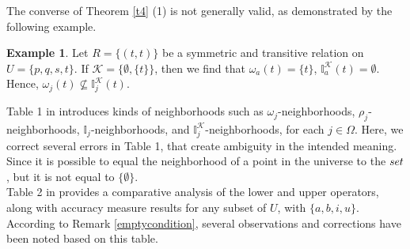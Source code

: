 \documentclass{article}
\theoremstyle{theorem}
\theoremstyle{definition}
\newtheorem{example}{Example}[section]
\theoremstyle{remark}
\begin{document}
The converse of Theorem \ref{t4} (1) is not generally valid, as demonstrated by the following example.

\begin{example}\label{e2} Let $R = \{(t, t)\}$ be a symmetric and transitive relation on $U=\{p, q, s, t\}$. If $\mathcal{K} = \{\emptyset, \{t\}\}$, then we find that $\omega_{a}(t)=\{t\}$, $\mathbb{I}^{\mathcal{K}}_{a}(t)=\emptyset$. Hence, $\omega_{j}(t) \nsubseteq \mathbb{I}^{\mathcal{K}}_{j}(t)$.
\end{example}

Table 1 in \cite{Al-shami 2024} introduces kinds of neighborhoods such as $\omega_{j}$-neighborhoods,  $\rho_{j}$-neighborhoods, $\mathbb{I}_{j}$-neighborhoods, and $\mathbb{I}^{\mathcal{K}}_{j}$-neighborhoods, for each $j \in \Omega$. Here, we correct several errors in Table 1, that create ambiguity in the intended meaning. Since it is possible to equal the neighborhood of a point in the universe to the $\empty set$, but it is not equal to  $\{\emptyset\}$.\\


Table 2 in \cite{Al-shami 2024} provides a comparative analysis of the lower and upper operators, along with accuracy measure results for any subset of $U$, with $\{a, b, i, u\}$. According to Remark \ref{emptycondition}, several observations and corrections have been noted based on this table.
\end{document}
